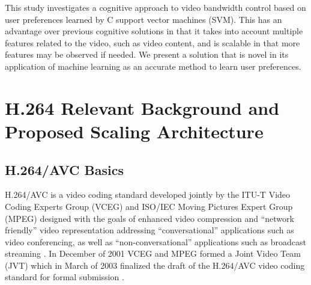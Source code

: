 This study investigates a cognitive approach to video bandwidth control based on user preferences learned by C support vector machines (SVM). This has an advantage over previous cognitive solutions in that it takes into account multiple features related to the video, such as video content, and is scalable in that more features may be observed if needed. We present a solution that is novel in its application of machine learning as an accurate method to learn user preferences.


\section{H.264 Relevant Background and Proposed Scaling Architecture}
\label{sec:H.264}

\subsection{H.264/AVC Basics}

H.264/AVC is a video coding standard developed jointly by the ITU-T Video Coding Experts Group (VCEG) and ISO/IEC Moving Pictures Expert Group (MPEG) designed with the goals of enhanced video compression and ``network friendly'' video representation addressing ``conversational'' applications such as video conferencing, as well as ``non-conversational'' applications such as broadcast streaming \cite{H264AVCOverview}. In December of 2001 VCEG and MPEG formed a Joint Video Team (JVT) which in March of 2003 finalized the draft of the H.264/AVC video coding standard for formal submission \cite{H264AVCOverview}. 

